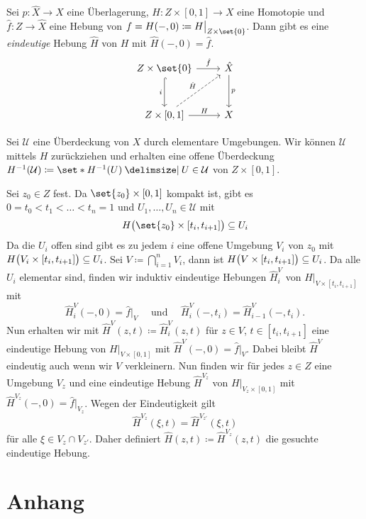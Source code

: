\begin{satz}[{name={Homotopiehebungssatz}},label=satz:hebung-homotopie]
	Sei $p \colon \hat{X} \to X$ eine Überlagerung, $H \colon Z \times [0,1] \to X$ eine Homotopie und $\hat{f} \colon Z \to \hat{X}$ eine Hebung von $f = H(-,0) \coloneqq H\big|_{Z \times \set{0}}$. 
	Dann gibt es eine \emph{eindeutige} Hebung $\hat{H}$ von $H$ mit $\hat{H}(-,0)= \hat{f}$.
	\[
		\begin{tikzcd}[row sep=3em]
			Z \times \set{0} \dar[hook, swap]{i} \rar{\hat{f}}& \hat{X} \dar{p} \\
			Z \times [0,1] \urar[dashed]{\hat{H}} \rar{H}& X  
		\end{tikzcd}
	\]
\end{satz}
\begin{beweis}
	Sei $\mathcal{U}$ eine Überdeckung von $X$ durch elementare Umgebungen. 
	Wir können $\mathcal{U}$ mittels $H$ zurückziehen und erhalten eine offene Überdeckung $H ^{-1}(\mathcal{U}) \coloneqq \set*{H ^{-1}(U) \given U \in \mathcal{U}}$ von $Z \times [0,1]$. 
	
	Sei $z_0 \in Z$ fest. Da $\set{z_0} \times [0,1]$ kompakt ist, gibt es $0 = t_0 < t_1 < \ldots < t_n=1$ und $U_1, \ldots , U_n \in \mathcal{U}$ mit
	\[
		H \enbrace[\big]{\set{z_0} \times [t_i, t_{i+1}] } \subseteq U_i
	\]
	Da die $U_i$ offen sind gibt es zu jedem $i$ eine offene Umgebung $V_i$ von $z_0$ mit $H\enbrace[\big]{V_i \times[t_i, t_{i+1}]} \subseteq U_i$. 
	Sei $V \coloneqq \bigcap_{i=1}^n V_i$, dann ist $H \enbrace[\big]{V \times [t_i, t_{i+1}]} \subseteq U_i$. 
	Da alle $U_i$ elementar sind, finden wir induktiv eindeutige Hebungen $\hat{H}_i^V$ von $H\big|_{V \times [t_i, t_{i+1}]}$ mit 
	\[
		\hat{H}_i^V(-,0)= \hat{f}\big|_{V}\quad \text{ und } \quad \hat{H}_i^V(-,t_{i}) = \hat{H}_{i-1}^V (-, t_{i}).
	\]
	Nun erhalten wir mit $\hat{H}^V(z,t) \coloneqq \hat{H}_i^V(z,t)$ für $z \in V$, $t \in [t_{i},t_{i+1}]$ eine eindeutige Hebung von $H\big|_{V \times [0,1]}$ mit $\hat{H}^V(-,0) = \hat{f}\big|_V$. 
	Dabei bleibt $\hat{H}^V$ eindeutig auch wenn wir $V$ verkleinern. 
	Nun finden wir für jedes $z \in Z$ eine Umgebung $V_z$ und eine eindeutige Hebung $\hat{H}^{V_z}$ von $H\big|_{V_z \times [0,1]}$ mit 
	\(
		\hat{H}^{V_z} (-,0) = \hat{f}\big|_{V_z}
	\).
	Wegen der Eindeutigkeit gilt 
	\[
		\hat{H}^{V_z} (\xi,t) = \hat{H}^{V_{z'}}(\xi,t)
	\]
	für alle $\xi \in V_z \cap V_{z'}$. 
	Daher definiert $\hat{H}(z,t) \coloneqq \hat{H}^{V_z}(z,t)$ die gesuchte eindeutige Hebung.
\end{beweis}

\cleardoubleoddemptypage
{}
\setcounter{page}{1}
\cleardoubleoddemptypage
\appendix

\section{Anhang} %
\label{sec:anhang}

\printindex
\printbibliography
\listoffigures

